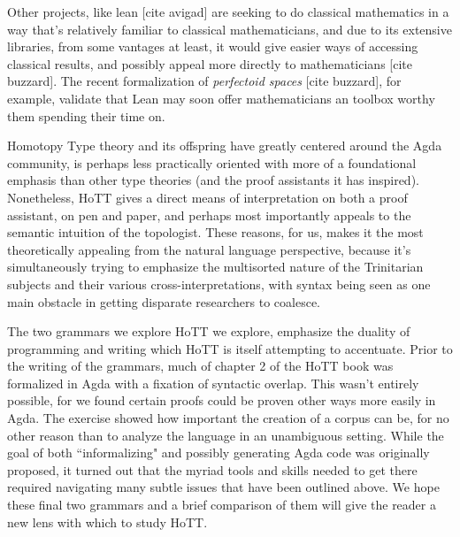 Other projects, like lean [cite avigad] are seeking to do classical mathematics
in a way that's relatively familiar to classical mathematicians, and due to its
extensive libraries, from some vantages at least, it would give easier
ways of accessing classical results, and possibly appeal more directly to
mathematicians [cite buzzard]. The recent formalization of \emph{perfectoid
  spaces} [cite buzzard], for example, validate that Lean may soon offer
mathematicians an toolbox worthy them spending their time on.

Homotopy Type theory and its offspring have greatly centered around the Agda
community, is perhaps less practically oriented with more of a foundational
emphasis than other type theories (and the proof assistants it has inspired).
Nonetheless, HoTT gives a direct means of interpretation on both a proof assistant,
on pen and paper, and perhaps most importantly appeals to the semantic intuition
of the topologist. These reasons, for us, makes it the most theoretically
appealing from the natural language perspective, because it's simultaneously
trying to emphasize the multisorted nature of the Trinitarian subjects and their
various cross-interpretations, with syntax being seen as one main obstacle in
getting disparate researchers to coalesce. 

The two grammars we explore HoTT we explore, emphasize the duality of
programming and writing which HoTT is itself attempting to accentuate. Prior to
the writing of the grammars, much of chapter 2 of the HoTT book was formalized
in Agda with a fixation of syntactic overlap. This wasn't entirely possible, for
we found certain proofs could be proven other ways more easily in Agda. The
exercise showed how important the creation of a corpus can be, for no other
reason than to analyze the language in an unambiguous setting. While the goal of
both ``informalizing" and possibly generating Agda code was originally proposed,
it turned out that the myriad tools and skills needed to get there required
navigating many subtle issues that have been outlined above. We hope these final
two grammars and a brief comparison of them will give the reader a new lens with
which to study HoTT.
